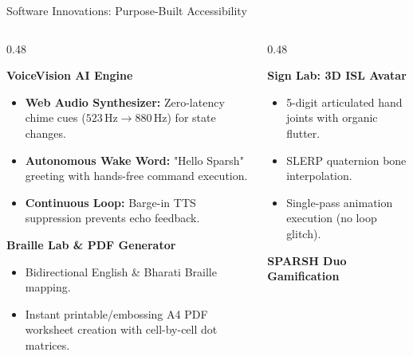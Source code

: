 \documentclass[aspectratio=169,10pt]{beamer}
\begin{document}
\begin{frame}{Software Innovations: Purpose-Built Accessibility}
    \begin{columns}[T]
        \begin{column}{0.48\textwidth}
            \begin{block}{\textbf{VoiceVision AI Engine}}
                \begin{itemize}
                    \item \textbf{Web Audio Synthesizer:} Zero-latency chime cues ($523\,\text{Hz} \rightarrow 880\,\text{Hz}$) for state changes.
                    \item \textbf{Autonomous Wake Word:} "Hello Sparsh" greeting with hands-free command execution.
                    \item \textbf{Continuous Loop:} Barge-in TTS suppression prevents echo feedback.
                \end{itemize}
            \end{block}
            \begin{block}{\textbf{Braille Lab \& PDF Generator}}
                \begin{itemize}
                    \item Bidirectional English \& Bharati Braille mapping.
                    \item Instant printable/embossing A4 PDF worksheet creation with cell-by-cell dot matrices.
                \end{itemize}
            \end{block}
        \end{column}
        \begin{column}{0.48\textwidth}
            \begin{block}{\textbf{Sign Lab: 3D ISL Avatar}}
                \begin{itemize}
                    \item 5-digit articulated hand joints with organic flutter.
                    \item SLERP quaternion bone interpolation.
                    \item Single-pass animation execution (no loop glitch).
                \end{itemize}
            \end{block}
            \begin{block}{\textbf{SPARSH Duo Gamification}}

\end{block}
\end{column}
\end{columns}
\end{frame}
\end{document}
